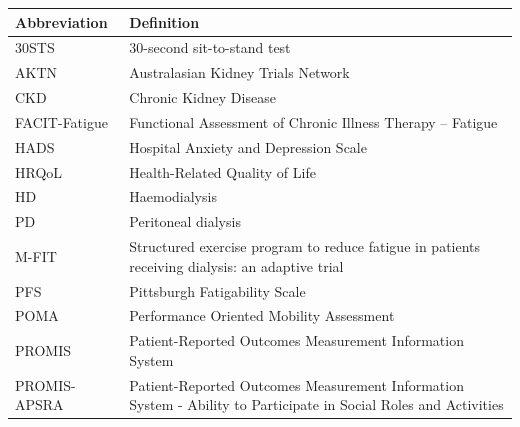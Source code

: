 \documentclass[11pt,parskip=half-]{scrartcl}
\renewcommand{\arraystretch}{0.5}
\begin{document}
\begin{table}[H]
  \renewcommand{\arraystretch}{1.25}
  \centering
  \begin{tabular}{p{}p{}}
    \toprule
    Abbreviation  & Definition                                                                                                       \\
    \midrule
    30STS         & 30-second sit-to-stand test                                                                                      \\
    AKTN          & Australasian Kidney Trials Network                                                                               \\
    CKD           & Chronic Kidney Disease                                                                                           \\
    FACIT-Fatigue & Functional Assessment of Chronic Illness Therapy – Fatigue                                                       \\
    HADS          & Hospital Anxiety and Depression Scale                                                                            \\
    HRQoL         & Health-Related Quality of Life                                                                                   \\
    HD            & Haemodialysis                                                                                                    \\
    PD            & Peritoneal dialysis                                                                                              \\
    M-FIT         & Structured exercise program to reduce fatigue in patients receiving dialysis: an adaptive trial                  \\
    PFS           & Pittsburgh Fatigability Scale                                                                                    \\
    POMA          & Performance Oriented Mobility Assessment                                                                         \\
    PROMIS        & Patient-Reported Outcomes Measurement Information System                                                         \\
    PROMIS-APSRA  & Patient-Reported Outcomes Measurement Information System - Ability to Participate in Social Roles and Activities \\

\end{tabular}
\end{table}
\end{document}

